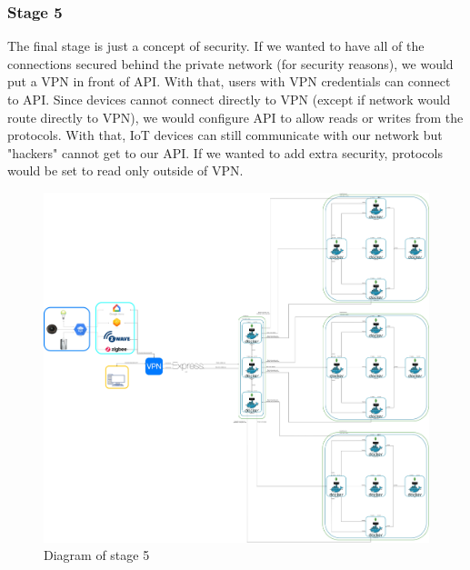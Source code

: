 \subsubsection{Stage 5}
The final stage is just a concept of security. If we wanted to have all of the connections secured behind the private network (for security reasons), we would put a VPN in front of API. With that, users with VPN credentials can connect to API. Since devices cannot connect directly to VPN (except if network would route directly to VPN), we would configure API to allow reads or writes from the protocols. With that, IoT devices can still communicate with our network but "hackers" cannot get to our API. If we wanted to add extra security, protocols would be set to read only outside of VPN.
\newline
\begin{figure}[H]
\includegraphics[scale=0.06]{img/systemDiagram-clusteredWithVPN.jpg}
\centering
\caption{Diagram of stage 5}
\end{figure}

